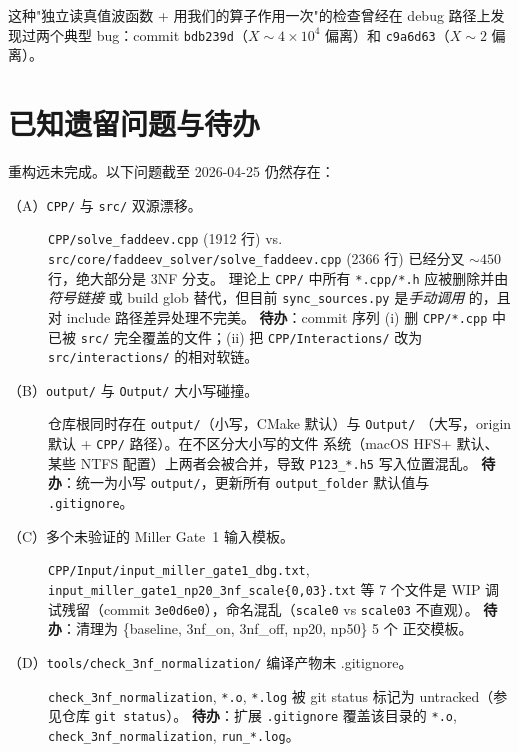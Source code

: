 这种"独立读真值波函数 + 用我们的算子作用一次"的检查曾经在
debug 路径上发现过两个典型 bug：commit \texttt{bdb239d}（$X \sim 4 \times 10^4$
偏离）和 \texttt{c9a6d63}（$X \sim 2$ 偏离）。

\section{已知遗留问题与待办}
\label{sec:19:legacy}

重构远未完成。以下问题截至 2026-04-25 仍然存在：

\begin{description}
\item[（A）\texttt{CPP/} 与 \texttt{src/} 双源漂移。]
      \texttt{CPP/solve\_faddeev.cpp} (1912 行) vs.
      \texttt{src/core/faddeev\_solver/solve\_faddeev.cpp} (2366 行)
      已经分叉 ${\sim}450$ 行，绝大部分是 3NF 分支。
      理论上 \texttt{CPP/} 中所有 \texttt{*.cpp/*.h} 应被删除并由\emph{符号链接}
      或 build glob 替代，但目前 \texttt{sync\_sources.py} 是\emph{手动调用}
      的，且对 include 路径差异处理不完美。
      \textbf{待办}：commit 序列 (i) 删 \texttt{CPP/*.cpp} 中已被
      \texttt{src/} 完全覆盖的文件；(ii) 把 \texttt{CPP/Interactions/} 改为
      \texttt{src/interactions/} 的相对软链。

\item[（B）\texttt{output/} 与 \texttt{Output/} 大小写碰撞。]
      仓库根同时存在 \texttt{output/}（小写，CMake 默认）与 \texttt{Output/}
      （大写，origin 默认 + \texttt{CPP/} 路径）。在不区分大小写的文件
      系统（macOS HFS+ 默认、某些 NTFS 配置）上两者会被合并，导致
      \texttt{P123\_*.h5} 写入位置混乱。
      \textbf{待办}：统一为小写 \texttt{output/}，更新所有 \texttt{output\_folder}
      默认值与 \texttt{.gitignore}。

\item[（C）多个未验证的 Miller Gate~1 输入模板。]
      \texttt{CPP/Input/input\_miller\_gate1\_dbg.txt},
      \texttt{input\_miller\_gate1\_np20\_3nf\_scale\{0,03\}.txt} 等 7 个文件是
      WIP 调试残留（commit \texttt{3e0d6e0}），命名混乱（\texttt{scale0} vs
      \texttt{scale03} 不直观）。
      \textbf{待办}：清理为 \{baseline, 3nf\_on, 3nf\_off, np20, np50\} 5 个
      正交模板。

\item[（D）\texttt{tools/check\_3nf\_normalization/} 编译产物未 .gitignore。]
      \texttt{check\_3nf\_normalization}, \texttt{*.o}, \texttt{*.log}
      被 git status 标记为 untracked（参见仓库 \texttt{git status}）。
      \textbf{待办}：扩展 \texttt{.gitignore} 覆盖该目录的 \texttt{*.o},
      \texttt{check\_3nf\_normalization}, \texttt{run\_*.log}。


\end{description}
